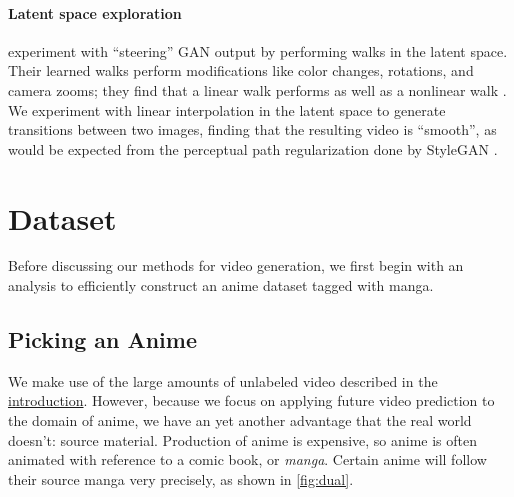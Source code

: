 \documentclass[11pt, oneside]{article}
\begin{document}
\paragraph{Latent space exploration}
\citeauthor*{steer} experiment with \enquote{steering} GAN output by performing
walks in the latent space. Their learned walks perform modifications like color
changes, rotations, and camera zooms; they find that a linear walk performs as
well as a nonlinear walk \cite{steer}. We experiment with linear interpolation
in the latent space to generate transitions between two images, finding
that the resulting video is \enquote{smooth}, as would be expected from the
perceptual path regularization done by StyleGAN \cite{stylegan, stylegan2}.

\section{Dataset} \label{sec:manga}
Before discussing our methods for video generation, we first begin with
an analysis to efficiently construct an anime dataset tagged with manga.

\subsection{Picking an Anime} 
We make use of the large amounts of unlabeled video described in the
\hyperref[sec:intro]{introduction}. However, because we focus on applying
future video prediction to the domain of anime, we have an yet another
advantage that the real world doesn't: source material. Production of
anime is expensive, so anime is often animated with reference to a comic
book, or \textit{manga}. Certain anime will follow their source manga
very precisely, as shown in \autoref{fig:dual}.
\end{document}

